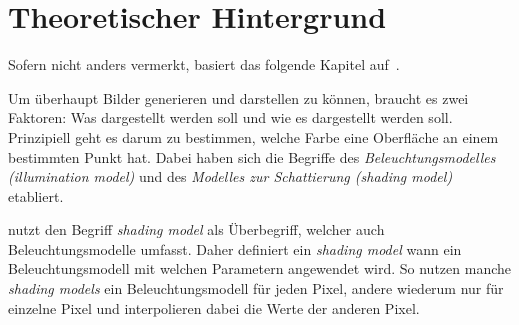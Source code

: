 
\chapter{Theoretischer Hintergrund}
\label{chap:theoretical_background}

Sofern nicht anders vermerkt, basiert das folgende Kapitel
auf~\cite{foley_computer_1996}.

Um überhaupt Bilder generieren und darstellen zu können, braucht es zwei
Faktoren: Was dargestellt werden soll und wie es dargestellt werden soll.
Prinzipiell geht es darum zu bestimmen, welche Farbe eine Oberfläche an einem
bestimmten Punkt hat. Dabei haben sich die Begriffe des
\textit{Beleuchtungsmodelles (illumination model)} und des \textit{Modelles zur Schattierung
(shading model)} etabliert.

\citeauthor{foley_computer_1996} nutzt den Begriff \textit{shading model} als
Überbegriff, welcher auch Beleuchtungsmodelle umfasst. Daher definiert ein
\textit{shading model} wann ein Beleuchtungsmodell mit welchen
Parametern angewendet wird. So nutzen manche \textit{shading models} ein
Beleuchtungsmodell für jeden Pixel, andere wiederum nur für einzelne Pixel und
interpolieren dabei die Werte der anderen Pixel.



